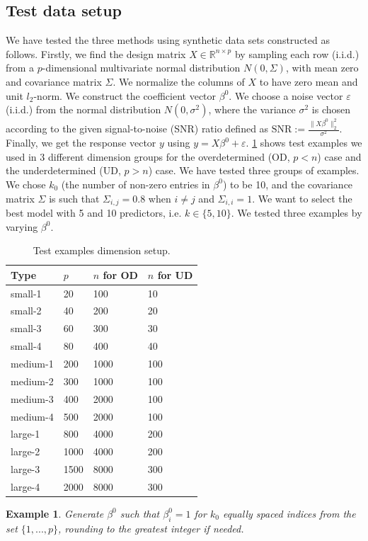 \documentclass[10pt, letterpaper]{article}
\newtheorem{example}{Example}
\begin{document}
\subsection{Test data setup}
We have tested the three methods using synthetic data sets constructed as follows. Firstly, we find the design matrix $X \in \mathbb{R}^{n \times p}$ by sampling each row (i.i.d.) from a $p$-dimensional multivariate normal distribution $N(0,\Sigma)$, with mean zero and covariance matrix $\Sigma$. We normalize the columns of $X$ to have zero mean and unit $l_{2}$-norm. We construct the coefficient vector $\beta^{0}$. We choose a noise vector $\varepsilon$ (i.i.d.) from the normal distribution $N(0,\sigma^{2})$, where the variance $\sigma^{2}$ is chosen according to the given signal-to-noise (SNR) ratio defined as
\( \text{SNR}:=\frac{\|X\beta^{0} \|_{2}^{2}}{ \sigma^{2} }.  \)
Finally, we get the response vector $y$ using $y=X\beta^{0}+\varepsilon$. 
\tablename{ \ref{tab:sma_med_lar_eg_setup}} shows test examples we used in 3 different dimension groups for the overdetermined (OD, $p<n$) case and the underdetermined (UD, $p>n$) case. We have tested three groups of examples. We chose $k_{0}$ (the number of non-zero entries in $\beta^{0}$) to be 10, and the covariance matrix $\Sigma$ is such that $\Sigma_{i,j}=0.8$ when $i\neq j$ and $\Sigma_{i,i}=1$. We want to select the best model with 5 and 10 predictors, i.e. $k \in \{5,10 \}$. We tested three examples by varying $\beta^{0}$.
\begin{table}
\centering
\caption{Test examples dimension setup.\label{tab:sma_med_lar_eg_setup}}
\begin{tabular}{l l l l }
     \hline
     Type & $p$ & $n$ for OD & $n$ for UD   \\
     \hline
     small-1 & 20 & 100 & 10 \\
     small-2 & 40 & 200 & 20 \\
     small-3 & 60 & 300 & 30 \\
     small-4 & 80 & 400 & 40 \\
     \hline
     medium-1 & 200 & 1000 & 100 \\
     medium-2 & 300 & 1000 & 100 \\
     medium-3 & 400 & 2000 & 100 \\
     medium-4 & 500 & 2000 & 100 \\
     \hline
     large-1 & 800 & 4000 & 200 \\
     large-2 & 1000 & 4000 & 200 \\
     large-3 & 1500 & 8000 & 300 \\
     large-4 & 2000 & 8000 & 300 \\
    \hline
\end{tabular}
\end{table}
\begin{example}
 Generate $\beta^{0}$ such that $\beta_{i}^{0}=1$ for $k_{0}$ equally spaced indices from the set $\{1,...,p \}$, rounding to the greatest integer if needed.    
\end{example}
\end{document}

